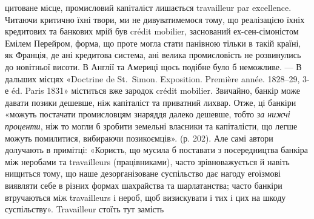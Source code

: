 цитоване місце, промисловий капіталіст лишається travailleur par excellence. Читаючи
критично їхні твори, ми не дивуватимемося тому, що реалізацією їхніх кредитових
та банкових мрій був crédit mobilier, заснований ех-сен-сімоністом Емілем
Перейром, форма, що проте могла стати панівною тільки в такій країні, як
Франція, де ані кредитова система, ані велика промисловість не розвинулись
до новітньої висоти. В Англії та Америці щось подібне було б неможливе. —
В дальших місцях «Doctrine de St.~Simon. Exposition. Première année. 1828--29,
3-е éd. Paris 1831» міститься вже зародок crédit mobilier. Звичайно,
банкір може давати позики дешевше, ніж капіталіст та приватний лихвар.
Отже, ці банкіри «можуть постачати промисловцям знаряддя далеко дешевше,
тобто \emph{за нижчі проценти}, ніж то могли б зробити земельні власники
та капіталісти, що легше можуть помилитися, вибираючи позикоємців».
(р. 202). Але самі автори долучають в примітці: «Користь, що мусила б поставати
з посередництва банкіра між неробами та travailleurs (працівниками),
часто зрівноважується й навіть нищиться тому, що наше дезорганізоване суспільство
дає нагоду егоїзмові виявляти себе в різних формах шахрайства та
шарлатанства; часто банкіри втручаються між travailleurs і нероб, щоб визискувати
і тих і цих на шкоду суспільству». Travailleur стоїть тут замість
\parbreak{}  %
